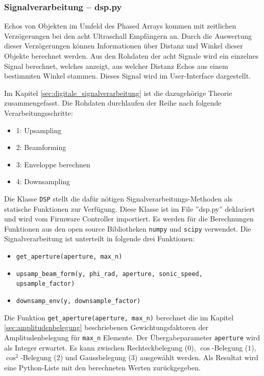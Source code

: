 \subsubsection{Signalverarbeitung -- dsp.py}\label{sec:signalverarbeitung}
Echos von Objekten im Umfeld des Phased Arrays kommen mit zeitlichen Verzögerungen bei den acht Ultraschall Empfängern an. Durch die Auswertung dieser Verzögerungen können Informationen über Distanz und Winkel dieser Objekte berechnet werden. Aus den Rohdaten der acht Signale wird ein einzelnes Signal berechnet, welches anzeigt, aus welcher Distanz Echos aus einem bestimmten Winkel stammen.
Dieses Signal wird im User-Interface dargestellt.

Im Kapitel \ref{sec:digitale_signalverarbeitung} ist die dazugehörige Theorie zusammengefasst. Die Rohdaten durchlaufen der Reihe nach folgende Verarbeitungsschritte:

\begin{itemize}
	\item 1: Upsampling
	\item 2: Beamforming
	\item 3: Enveloppe berechnen
	\item 4: Downsampling
\end{itemize}

Die Klasse \texttt{DSP} stellt die dafür nötigen Signalverarbeitungs-Methoden als statische Funktionen zur Verfügung. Diese Klasse ist im File ''dsp.py'' deklariert und wird vom Firmware Controller importiert. Es werden für die Berechnungen Funktionen aus den open source Bibliotheken \texttt{numpy} und \texttt{scipy} verwendet. Die Signalverarbeitung ist unterteilt in folgende drei Funktionen:

\begin{itemize}
	\item \texttt{get\_aperture(aperture, max\_n)}
	\item \texttt{upsamp\_beam\_form(y, phi\_rad, aperture, sonic\_speed, upsample\_factor)}
	\item \texttt{downsamp\_env(y, downsample\_factor)}
\end{itemize}

Die Funktion \texttt{get\_aperture(aperture, max\_n)} berechnet die im Kapitel \ref{sec:amplitudenbelegung} beschriebenen Gewichtungsfaktoren der Amplitudenbelegung für \texttt{max\_n} Elemente. Der Übergabeparameter \texttt{aperture} wird als Integer erwartet. Es kann zwischen Rechteckbelegung ($0$), $\cos$-Belegung ($1$), $\cos^{2}$-Belegung ($2$) und Gauss\-belegung ($3$) ausgewählt werden. Als Resultat wird eine Python-Liste mit den berechneten Werten zurückgegeben.

